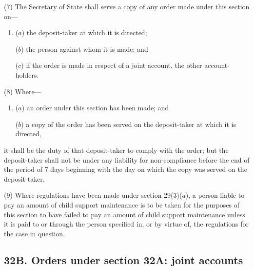 \documentclass[a4paper]{article}
\begin{document}
(7) The Secretary of State shall serve a copy of any order made under this section on---
\begin{enumerate}\item[]
($a$) the deposit-taker at which it is directed;

($b$) the person against whom it is made; and

($c$) if the order is made in respect of a joint account, the other account-holders.
\end{enumerate}

(8)
Where---
\begin{enumerate}\item[]
($a$)
an order under this section has been made; and

($b$)
a copy of the order has been served on the deposit-taker at which it is directed, 
\end{enumerate}
it shall be the duty of that deposit-taker to comply with the order; but the deposit-taker shall not be under any liability for non-compliance before the end of the period of 7 days beginning with the day on which the copy was served on the deposit-taker.

(9)
Where regulations have been made under section 29(3)($a$), a person liable to pay an amount of child support maintenance is to be taken for the purposes of this section to have failed to pay an amount of child support maintenance unless it is paid to or through the person specified in, or by virtue of, the regulations for the case in question.


\subsection{32B. Orders under section 32A: joint accounts}
\end{document}
